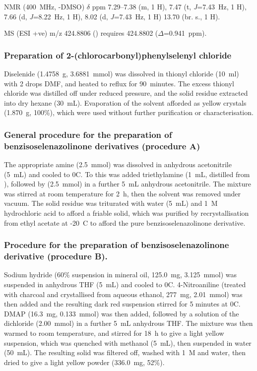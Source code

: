 \begin{refsection}
 NMR (400~MHz, -DMSO) $\delta$ ppm
7.29--7.38 (m, 1 H),
7.47 (t, \emph{J}=7.43~Hz, 1 H),
7.66 (d, \emph{J}=8.22~Hz, 1 H),
8.02 (d, \emph{J}=7.43~Hz, 1 H)
13.70 (br. s., 1 H).

MS (ESI +ve) m/z 424.8806 ()  requires 424.8802 ($\Delta$=0.941~ppm).

\subsubsection[Preparation of \refcmpd{dichloride}]{Preparation of 2-(chlorocarbonyl)phenylselenyl chloride }
Diselenide  (1.4758~g, 3.6881~mmol) was dissolved in thionyl chloride (10~ml) with 2 drops DMF, and heated to reflux for 90~minutes.
The excess thionyl chloride was distilled off under reduced pressure, and the solid residue extracted into dry hexane (30~mL).
Evaporation of the solvent afforded  as yellow crystals (1.870~g, 100\%), which were used without further purification or characterisation.

\subsubsection[General procedure A]{General procedure for the preparation of benzisoselenazolinone derivatives  (procedure A)}
The appropriate amine (2.5~mmol) was dissolved in anhydrous acetonitrile (5~mL) and cooled to 0\degree C.
To this was added triethylamine (1~mL, distilled from ), followed by  (2.5~mmol) in a further 5~mL anhydrous acetonitrile.
The mixture was stirred at room temperature for 2~h, then the solvent was removed under vacuum.
The solid residue was triturated with water (5~mL) and 1~\textsc{M} hydrochloric acid to afford a friable solid, which was purified by recrystallisation from ethyl acetate at -20\degree~C to afford the pure benzisoselenazolinone derivative.

\subsubsection[General procedure B]{Procedure for the preparation of benzisoselenazolinone derivative  (procedure B).}
Sodium hydride (60\% suspension in mineral oil, 125.0~mg, 3.125~mmol) was suspended in anhydrous THF (5~mL) and cooled to 0\degree C.
4-Nitroaniline (treated with charcoal and crystallised from aqueous ethanol, 277~mg, 2.01~mmol) was then added and the resulting dark red suspension stirred for 5 minutes at 0\degree C.
DMAP (16.3~mg, 0.133~mmol) was then added, followed by a solution of the dichloride  (2.00~mmol) in a further 5~mL anhydrous THF.
The mixture was then warmed to room temperature, and stirred for 18~h to give a light yellow suspension, which was quenched with methanol (5~mL), then suspended in water (50~mL).
The resulting solid was filtered off, washed with 1~\textsc{M}  and water, then dried to give a light yellow powder (336.0~mg, 52\%).


\end{refsection}
